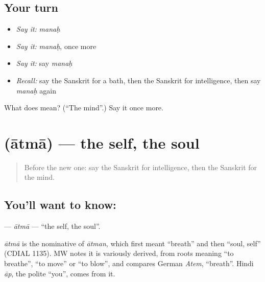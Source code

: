 \subsection*{Your turn}
\begin{itemize}
\raggedright
  \item \emph{Say it:} \emph{manaḥ}
  \item \emph{Say it:} \emph{manaḥ}, once more
  \item \emph{Say it:} say \emph{manaḥ}
  \item \emph{Recall:} say the Sanskrit for a bath, then the Sanskrit for intelligence, then say \emph{manaḥ} again
\end{itemize}

\begin{tcolorbox}[breakable,colback=teal!4,colframe=teal!35!black,title={Before you move on}]
What does  mean? (\textquotedblleft{}The mind\textquotedblright{}.) Say it once more.
\end{tcolorbox}
\section[\texorpdfstring{\sk{आत्मा} (ātmā)}{आत्मा (ātmā)}]{ (ātmā) — the self, the soul}

\label{lesson:SA-C212-atma}



\begin{quote}
Before the new one: say the Sanskrit for intelligence, then the Sanskrit for the mind.
\end{quote}

\subsection*{You'll want to know: }
\textbf{} — \emph{ātmā} — \textquotedblleft{}the self, the soul\textquotedblright{}.

\begin{cousinweb}
\emph{ātmā} is the nominative of \emph{ātman}, which first meant \textquotedblleft{}breath\textquotedblright{} and then \textquotedblleft{}soul, self\textquotedblright{} (CDIAL 1135). MW notes it is variously derived, from roots meaning \textquotedblleft{}to breathe\textquotedblright{}, \textquotedblleft{}to move\textquotedblright{} or \textquotedblleft{}to blow\textquotedblright{}, and compares German \emph{Atem}, \textquotedblleft{}breath\textquotedblright{}. Hindi \emph{āp}, the polite \textquotedblleft{}you\textquotedblright{}, comes from it.
\end{cousinweb}

